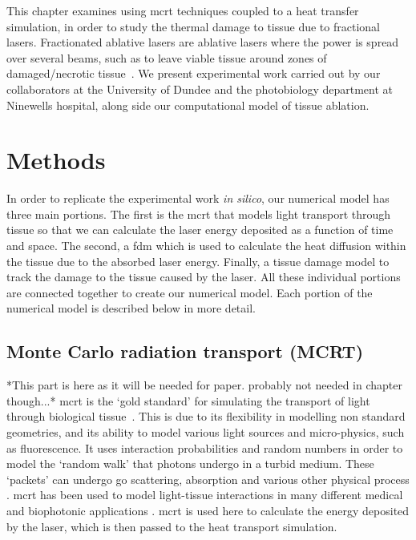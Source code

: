 This chapter examines using \gls{mcrt} techniques coupled to a heat transfer simulation, in order to study the thermal damage to tissue due to fractional lasers. Fractionated ablative lasers  are ablative lasers where the power is spread over several beams, such as to leave viable tissue around zones of damaged/necrotic tissue~\cite{manstein2004fractional}. We present experimental work carried out by our collaborators at the University of Dundee and the photobiology department at Ninewells hospital, along side our computational model of tissue ablation.

\section{Methods}

In order to replicate the experimental work \textit{in silico}, our numerical model has three main portions. The first is the \gls{mcrt} that models light transport through tissue so that we can calculate the laser energy deposited as a function of time and space. The second, a \gls{fdm} which is used to calculate the heat diffusion within the tissue due to the absorbed laser energy. Finally, a tissue damage model to track the damage to the tissue caused by the laser. All these individual portions are connected together to create our numerical model. Each portion of the numerical model is described below in more detail.

\subsection{Monte Carlo radiation transport (MCRT)}%

*This part is here as it will be needed for paper. probably not needed in chapter though...*
\gls{mcrt} is the `gold standard' for simulating the transport of light through biological tissue~\cite{kong2008efficient}. This is due to its flexibility in modelling non standard geometries, and its ability to model various light sources and micro-physics, such as fluorescence. It uses interaction probabilities and random numbers in order to model the `random walk' that photons undergo in a turbid medium. These `packets' can undergo go scattering, absorption and various other physical process \cite{yao1999monte,welch1997propagation}. \gls{mcrt} has been used to model light-tissue interactions in many different medical and biophotonic applications \cite{campbell2015monte,boas2002three,patwardhan2005monte}. \gls{mcrt} is used here to calculate the energy deposited by the laser, which is then passed to the heat transport simulation.

